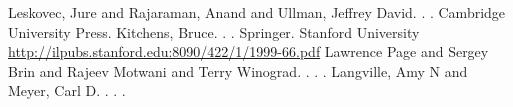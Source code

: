 \documentclass[10pt]{beamer}
\begin{document}
\begin{frame}
  \begin{thebibliography}{10}
      \beamertemplatebookbibitems
      Leskovec, Jure and Rajaraman, Anand and Ullman, Jeffrey David.
      .
      .
      \newblock Cambridge University Press.
      \beamertemplatearticlebibitems
        Kitchens, Bruce.
        .
        .
        \newblock Springer.
        Stanford University
        \newblock  \url{http://ilpubs.stanford.edu:8090/422/1/1999-66.pdf}
      \beamertemplatearticlebibitems
        Lawrence Page and Sergey Brin and Rajeev Motwani and Terry Winograd.
        .
        .
        .
      \beamertemplatearticlebibitems
        Langville, Amy N and Meyer, Carl D.
        .
        .
        .
  \end{thebibliography}
\end{frame}
\end{document}
